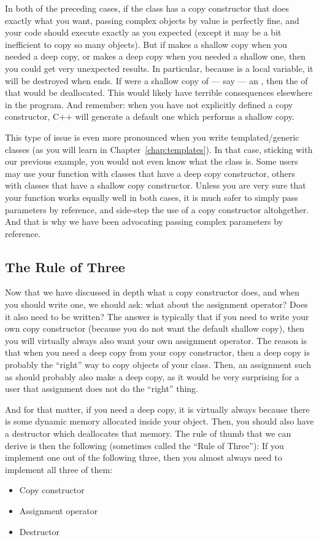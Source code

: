 In both of the preceding cases, 
if the class  has a copy constructor that does exactly what
you want, passing complex objects by value is perfectly fine,
and your code should execute exactly as you expected
(except it may be a bit inefficient to copy so many objects). 
But if  makes a shallow copy when you needed a deep copy,
or makes a deep copy when you needed a shallow one,
then you could get very unexpected results.
In particular, because  is a local variable,
it will be destroyed when  ends.
If  were a shallow copy of --- say --- an
, then the  of that  would be
deallocated.
This would likely have terrible consequences elsewhere in the program.
And remember: when you have not explicitly defined a copy constructor,
C++ will generate a default one which performs a shallow copy.

This type of issue is even more pronounced when you write
templated/generic classes (as you will learn in Chapter~\ref{chap:templates}).
In that case, sticking with our previous example, you would not even
know what the class  is.
Some users may use your function  with classes that have a
deep copy constructor,
others with classes that have a shallow copy constructor. 
Unless you are very sure that your function works equally well in both cases,
it is much safer to simply pass parameters by reference,
and side-step the use of a copy constructor altohgether.
And that is why we have been advocating passing complex parameters by reference.

\subsection{The Rule of Three}
Now that we have discussed in depth what a copy constructor does,
and when you should write one, we should ask:
what about the assignment operator?
Does it also need to be written?
The answer is typically that if you need to write your own copy
constructor (because you do not want the default shallow copy),
then you will virtually always also want your own assignment operator.
The reason is that when you need a deep copy from your copy constructor,
then a deep copy is probably the ``right'' way to copy objects of your
class. 
Then, an assignment such as  should probably also make a
deep copy, as it would be very surprising for a user that assignment
does not do the ``right'' thing.

And for that matter, if you need a deep copy, it is virtually always
because there is some dynamic memory allocated inside your object.
Then, you should also have a destructor which deallocates that memory.
The rule of thumb that we can derive is then the following (sometimes
called the ``Rule of Three''): If you implement one out of the
following three, then you almost always need to implement all three of
them:

\begin{itemize}
\item Copy constructor
\item Assignment operator
\item Destructor
\end{itemize}
